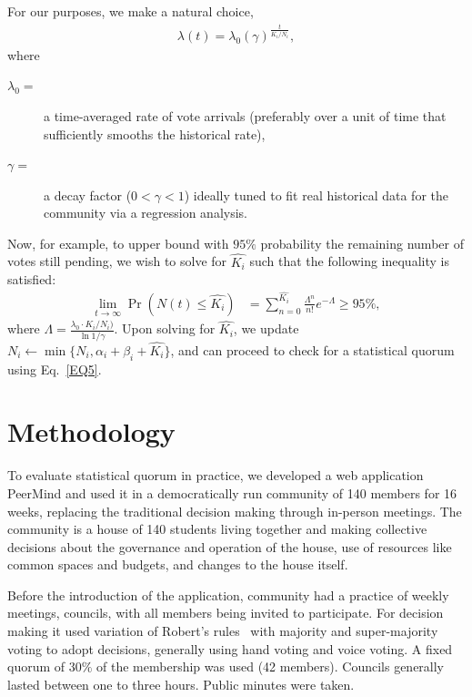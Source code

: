 \documentclass[format=acmsmall, review=true, screen=true, anonymous=true]{acmart}
\begin{document}
For our purposes, we make a natural choice,
\begin{align}\label{EQ6}
\lambda (t) = \lambda_0 {(\gamma)}^{\frac{t}{K_i/N_i}},
\end{align}
where
\begin{description}
\item[$\lambda_0 =$] a time-averaged rate of vote arrivals (preferably over a unit of time that
sufficiently smooths the historical rate),
\item[$\gamma =$] a decay factor ($0 < \gamma < 1$) ideally tuned to fit real historical data
for the community via a regression analysis.
\end{description}
Now, for example, to upper bound with $95\%$ probability the remaining number of votes still
pending, we wish to solve for $\hat{K_i}$ such that the following inequality is satisfied:
\begin{align}\label{EQ7}
\lim_{t\rightarrow \infty}\Pr\left(N(t)\leq \hat{K_i}\right) & = \sum_{n=0}^{\hat{K_i}} \frac{\Lambda^n}{n!}e^{-\Lambda} \geq 95\%,
\end{align}
where $\Lambda = \frac{\lambda_0 \cdot K_i/N_i)}{\ln{1/\gamma}}$.
Upon solving for $\hat{K_i}$, we update $N_i \leftarrow \min\{N_i,\alpha_i + \beta_i + \hat{K_i}\}$,
and can proceed to check for a statistical quorum using Eq.~\ref{EQ5}.


\section{Methodology}
\label{sec:methodology}

To evaluate statistical quorum in practice, we developed a web application PeerMind and
used it in a democratically run community of 140 members for 16 weeks, replacing the traditional
decision making through in-person meetings. The community is a house of 140
students living together and making collective decisions about the governance and operation of
the house, use of resources like common spaces and budgets, and changes to the house itself.

Before the introduction of the application, community had a practice of weekly meetings, councils, with all
members being invited to participate. For decision making it used variation of Robert's rules~\cite{roberts}
with majority and super-majority voting to adopt decisions, generally using hand voting and voice voting.
A fixed quorum of $30\%$ of the membership was used (42 members). Councils generally lasted between one to three hours.
Public minutes were taken.
\end{document}
